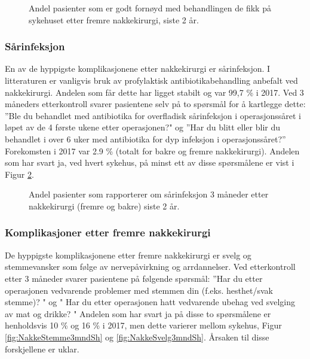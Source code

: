 \begin{figure}[ht]
\caption{\label{fig:NakkeFornoydBeh12mndFremSh} Andel pasienter som er godt fornøyd med behandlingen de fikk på sykehuset etter fremre nakkekirurgi, siste 2 år.}
\end{figure}


\clearpage

\subsubsection{Sårinfeksjon }


En av de hyppigste komplikasjonene etter nakkekirurgi er sårinfeksjon. I litteraturen er vanligvis bruk av profylaktisk antibiotikabehandling  anbefalt ved 
nakkekirurgi. Andelen som får dette har ligget stabilt og var 99,7 \% i 2017.
Ved  3 måneders etterkontroll svarer pasientene selv 
på to spørsmål  for å kartlegge dette: ''Ble du behandlet med antibiotika for overfladisk sårinfeksjon i operasjonssåret i løpet av de 4 første ukene etter operasjonen?" og 
''Har du blitt eller blir du behandlet i over 6 uker med antibiotika for dyp infeksjon i operasjonssåret?''  Forekomsten i 2017 var 
2.9 \% (totalt for bakre og fremre nakkekirurgi).  Andelen som har svart ja, ved hvert sykehus, på minst ett av disse spørsmålene er vist i Figur \ref{fig:NakkeKomplinfek3mndSh}.  

\begin{figure}[ht]
\caption{\label{fig:NakkeKomplinfek3mndSh} Andel pasienter som rapporterer om sårinfeksjon 3 måneder etter nakkekirurgi (fremre og bakre) siste 2 år. }
\end{figure}

\clearpage

\subsubsection{Komplikasjoner etter fremre nakkekirurgi}
De hyppigste komplikasjonene etter fremre nakkekirurgi er svelg og stemmevansker som følge 
av nervepåvirkning og arrdannelser. Ved etterkontroll etter 3 måneder svarer pasientene på
følgende spørsmål: ''Har du etter operasjonen vedvarende problemer med stemmen din 
(f.eks. hesthet/svak stemme)? " og " Har du etter operasjonen hatt vedvarende ubehag ved svelging av mat og drikke? "
Andelen som har svart ja på disse to spørsmålene er henholdsvis 10 \% og 16 \% i 2017, men dette  varierer mellom sykehus, Figur \ref{fig:NakkeStemme3mndSh} og \ref{fig:NakkeSvelg3mndSh}. Årsaken til disse forskjellene er uklar. 


